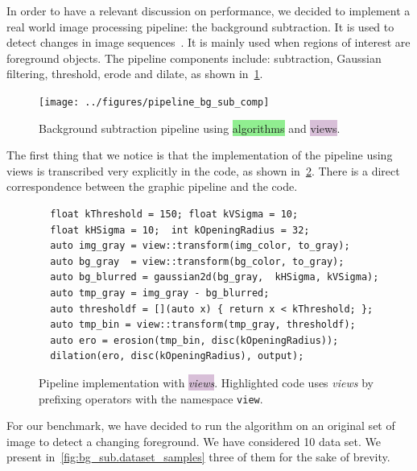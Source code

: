 In order to have a relevant discussion on performance, we decided to implement a real world image processing pipeline:
the background subtraction. It is used to detect changes in image sequences~\parencite{opencv.bg_sub}. It is mainly used
when regions of interest are foreground objects. The pipeline components include: subtraction, Gaussian filtering,
threshold, erode and dilate, as shown in~\ref{fig.view.comp.sub_bg}.

\begin{figure}[htbp]
  \centering
  \texttt{[image: ../figures/pipeline\_bg\_sub\_comp]}
  \caption{Background subtraction pipeline using \colorbox{lightgreen}{algorithms} and
    \colorbox{thistle}{views}.}
  \label{fig.view.comp.sub_bg}
\end{figure}

The first thing that we notice is that the implementation of the pipeline using views is transcribed very explicitly in
the code, as shown in~\cref{fig.view.comp.sub_bg.view_code}. There is a direct correspondence between the graphic
pipeline and the code.

\begin{figure}
  \begin{verbatim}
  float kThreshold = 150; float kVSigma = 10;
  float kHSigma = 10;  int kOpeningRadius = 32;
  auto img_gray = view::transform(img_color, to_gray);
  auto bg_gray  = view::transform(bg_color, to_gray);
  auto bg_blurred = gaussian2d(bg_gray,  kHSigma, kVSigma);
  auto tmp_gray = img_gray - bg_blurred;
  auto thresholdf = [](auto x) { return x < kThreshold; };
  auto tmp_bin = view::transform(tmp_gray, thresholdf);
  auto ero = erosion(tmp_bin, disc(kOpeningRadius));
  dilation(ero, disc(kOpeningRadius), output);
  \end{verbatim}
  \caption{Pipeline implementation with \colorbox{thistle}{\emph{views}}. Highlighted code uses \emph{views} by
    prefixing operators with the namespace \texttt{view}.}
  \label{fig.view.comp.sub_bg.view_code}
\end{figure}

For our benchmark, we have decided to run the algorithm on an original set of image to detect a changing foreground.
We have considered 10 data set. We present in~\cref{fig:bg_sub.dataset_samples} three of them for the sake of brevity.

